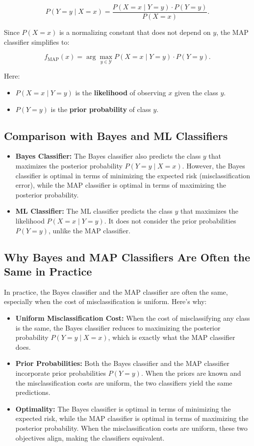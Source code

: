 \begin{notechapter}
\[
P(Y = y \mid X = x) = \frac{P(X = x \mid Y = y) \cdot P(Y = y)}{P(X = x)}.
\]

Since \( P(X = x) \) is a normalizing constant that does not depend on \( y \), the MAP classifier simplifies to:

\[
f_{\text{MAP}}(x) = \arg\max_{y \in \mathcal{Y}} P(X = x \mid Y = y) \cdot P(Y = y).
\]

Here:
\begin{itemize}
    \item \( P(X = x \mid Y = y) \) is the \textbf{likelihood} of observing \( x \) given the class \( y \).
    \item \( P(Y = y) \) is the \textbf{prior probability} of class \( y \).
\end{itemize}

\subsection{Comparison with Bayes and ML Classifiers}
\begin{itemize}
    \item \textbf{Bayes Classifier:} The Bayes classifier also predicts the class \( y \) that maximizes the posterior probability \( P(Y = y \mid X = x) \). However, the Bayes classifier is optimal in terms of minimizing the expected risk (misclassification error), while the MAP classifier is optimal in terms of maximizing the posterior probability.
    \item \textbf{ML Classifier:} The ML classifier predicts the class \( y \) that maximizes the likelihood \( P(X = x \mid Y = y) \). It does not consider the prior probabilities \( P(Y = y) \), unlike the MAP classifier.
\end{itemize}

\subsection{Why Bayes and MAP Classifiers Are Often the Same in Practice}
In practice, the Bayes classifier and the MAP classifier are often the same, especially when the cost of misclassification is uniform. Here's why:
\begin{itemize}
    \item \textbf{Uniform Misclassification Cost:} When the cost of misclassifying any class is the same, the Bayes classifier reduces to maximizing the posterior probability \( P(Y = y \mid X = x) \), which is exactly what the MAP classifier does.
    \item \textbf{Prior Probabilities:} Both the Bayes classifier and the MAP classifier incorporate prior probabilities \( P(Y = y) \). When the priors are known and the misclassification costs are uniform, the two classifiers yield the same predictions.
    \item \textbf{Optimality:} The Bayes classifier is optimal in terms of minimizing the expected risk, while the MAP classifier is optimal in terms of maximizing the posterior probability. When the misclassification costs are uniform, these two objectives align, making the classifiers equivalent.
\end{itemize}


\end{notechapter}
